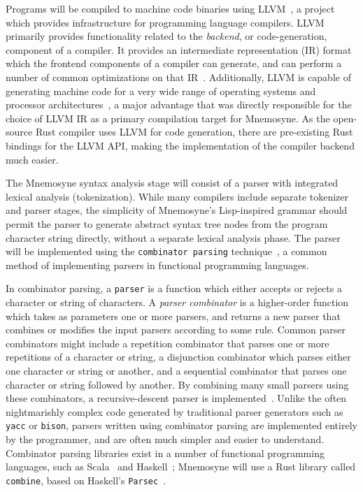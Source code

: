 \documentclass[11pt,draft]{article}
\theoremstyle{break}
\begin{document}
Programs will be compiled to machine code binaries using LLVM~\cite{Lattner:2004:LCF:977395.977673}, a project which provides infrastructure for programming language compilers. LLVM primarily provides functionality related to the \textit{backend}, or code-generation, component of a compiler. It provides an intermediate representation (IR) format which the frontend components of a compiler can generate, and can perform a number of common optimizations on that IR~\cite{Lattner:2004:LCF:977395.977673,Terei:2010:LBG:1863523.1863538}. Additionally, LLVM is capable of generating machine code for a very wide range of operating systems and processor architectures~\cite{Lattner:2004:LCF:977395.977673,Terei:2010:LBG:1863523.1863538}, a major advantage that was directly responsible for the choice of LLVM IR as a primary compilation target for Mnemosyne. As the open-source Rust compiler uses LLVM for code generation, there are pre-existing Rust bindings for the LLVM API, making the implementation of the compiler backend much easier.

The Mnemosyne syntax analysis stage will consist of a parser with integrated lexical analysis (tokenization). While many compilers include separate tokenizer and parser stages, the simplicity of Mnemosyne's Lisp-inspired grammar should permit the parser to generate abstract syntax tree nodes from the program character string directly, without a separate lexical analysis phase. The parser will be implemented using the \texttt{combinator parsing} technique~\cite{swierstra2001combinator,frost2008parser,fokker1995functional,hutton1996monadic}, a common method of implementing parsers in functional programming languages.

In combinator parsing, a \texttt{parser} is a function which either accepts or rejects a character or string of characters. A \textit{parser combinator} is a higher-order function which takes as parameters one or more parsers, and returns a new parser that combines or modifies the input parsers according to some rule.  Common parser combinators might include a repetition combinator that parses one or more repetitions of a character or string, a disjunction combinator which parses either one character or string or another, and a sequential combinator that parses one character or string followed by another. By combining many small parsers using these combinators, a recursive-descent parser is implemented~\cite{Danielsson:2010:TPC:1932681.1863585,swierstra2001combinator,hutton1996monadic}. Unlike the often nightmarishly complex code generated by traditional parser generators such as \texttt{yacc} or \texttt{bison}, parsers written using combinator parsing are implemented entirely by the programmer, and are often much simpler and easier to understand. Combinator parsing libraries exist in a number of functional programming languages, such as Scala~\cite{moors2008parser} and Haskell~\cite{leijen2002parsec}; Mnemosyne will use a Rust library called \texttt{combine}, based on Haskell's \texttt{Parsec}~\cite{leijen2002parsec}.
\end{document}

